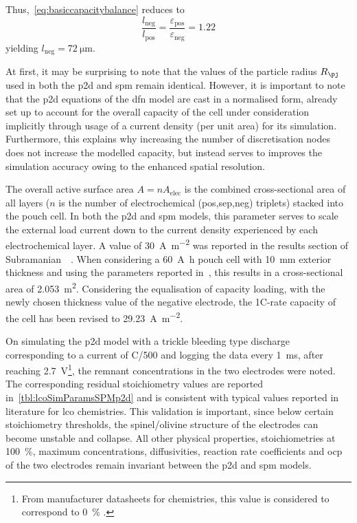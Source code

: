 Thus,~\cref{eq:basiccapacitybalance} reduces to
\begin{equation}
    \frac{l_\text{neg}}{l_\text{pos}} = \frac{\varepsilon_\text{pos}}{\varepsilon_\text{neg}} = 1.22
\end{equation}
yielding $l_\text{neg} = \SI{72}{\micro\meter}$.

At first, it  may be surprising to  note that the values of  the particle radius
$R_\pj$ used in  both the \gls{p2d} and \gls{spm} remain  identical. However, it
is important  to note that  the \gls{p2d} equations  of the \gls{dfn}  model are
cast in  a normalised  form, \ie{}  already set  up to  account for  the overall
capacity of the  cell under consideration implicitly through usage  of a current
density  (per unit  area) for  its  simulation. Furthermore,  this explains  why
increasing the  number of  discretisation nodes does  not increase  the modelled
capacity, but  instead serves to improves  the simulation accuracy owing  to the
enhanced spatial resolution.

The  overall  active  surface  area  $A  =  n  A_\text{elec}$  is  the  combined
cross-sectional  area  of all  layers  ($n$  is  the number  of  electrochemical
(pos,sep,neg) triplets) stacked  into the pouch cell. In both  the \gls{p2d} and
\gls{spm}  models, this  parameter serves  to  scale the  external load  current
down  to  the current  density  experienced  by  each electrochemical  layer.  A
value  of  \approx\SI{30}{\ampere \per  \meter  \squared}  was reported  in  the
results section of  Subramanian~\etal{}~\cite{Subramanian2009}. When considering
a \SI{60}{\ampere\hour} pouch cell with \SI{10}{\milli\meter} exterior thickness
and  using  the  parameters  reported  in~\cite{Subramanian2009},  this  results
in  a cross-sectional  area of  \SI{2.053}{\meter\squared}.  Considering  the
equalisation of capacity  loading, with the newly chosen thickness  value of the
negative  electrode, the  1C-rate  capacity  of the  cell  has  been revised  to
\SI{29.23}{\ampere\per\meter\squared}.

On  simulating  the \gls{p2d}  model  with  a  trickle bleeding  type  discharge
corresponding   to   a  current   of   C/500   and   logging  the   data   every
\SI{1}{\milli\second}, after reaching \SI{2.7}{\volt}\footnote{From manufacturer
datasheets  for   chemistries,  this value  is considered  to
correspond to \SI{0}{\percent} .}, the remnant concentrations
in  the two  electrodes  were noted.  The  corresponding residual  stoichiometry
values  are reported  in~\cref{tbl:lcoSimParamsSPMp2d}  and  is consistent  with
typical values reported in literature for \gls{lco} chemistries.  This validation is  important, since below  certain stoichiometry
thresholds, the spinel/olivine  structure of the electrodes  can become unstable
and  collapse.  All other  physical properties,  \viz{}
stoichiometries  at \SI{100}{\percent},  maximum concentrations,  diffusivities,
reaction rate coefficients and \gls{ocp}  of the two electrodes remain invariant
between the \gls{p2d} and \gls{spm} models.

